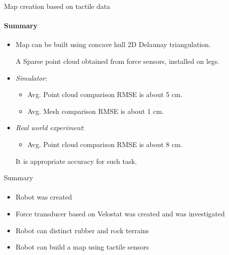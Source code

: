 \documentclass[aspectratio=169]{beamer}
\newcommand{\fbckg}[1]{\usebackgroundtemplate{\texttt{[image: \#1]}}}%
\begin{document}
\begin{frame}[t]{Map creation based on tactile data}
    \framesubtitle{Summary}
    \Large
    \begin{itemize}
        \item Map can be built using concave hull 2D Delaunay triangulation.

              A Sparse point cloud obtained from force sensors, installed on legs.
        \item \textit{Simulator}: \begin{itemize}
                  \item Avg. Point cloud comparison RMSE is about 5 cm.
                  \item Avg. Mesh comparison RMSE is about 1 cm.
              \end{itemize}
        \item \textit{Real world experiment}: \begin{itemize}
                  \item Avg. Point cloud comparison RMSE is about 8 cm.
              \end{itemize}
              It is appropriate accuracy for such task.
    \end{itemize}
\end{frame}

\begin{frame}[t]{Summary}
    \framesubtitle{}
    \Large
    \begin{itemize}
        \item Robot was created
        \item Force transducer based on Velostat was created and was investigated
        \item Robot can distinct rubber and rock terrains
        \item Robot can build a map using tactile sensors
    \end{itemize}
\end{frame}

\end{document}
